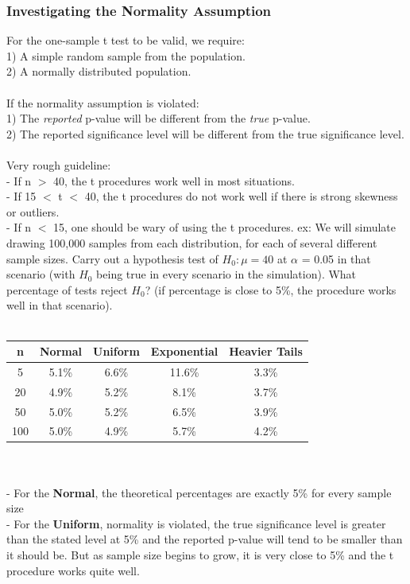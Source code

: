\documentclass[12pt, a4paper]{article}
\begin{document}
		\subsubsection{Investigating the Normality Assumption}
		For the one-sample t test to be valid, we require: \\
		1) A simple random sample from the population. \\
		2) A normally distributed population. \\~\\
		If the normality assumption is violated: \\
		1) The \textit{reported} p-value will be different from the \textit{true} p-value. \\
		2) The reported significance level will be different from the true significance level. \\~\\
		Very rough guideline: \\
		- If n $>$ 40, the t procedures work well in most situations. \\
		- If 15 $<$ t $<$ 40, the t procedures do not work well if there is strong skewness or outliers. \\
		- If n $<$ 15, one should be wary of using the t procedures. \newpage
		\noindent ex: We will simulate drawing 100,000 samples from each distribution, for each of several different sample sizes. Carry out a hypothesis test of $H_0: \mu = 40$ at $\alpha$ = 0.05 in that scenario (with $H_0$ being true in every scenario in the simulation). What percentage of tests reject $H_0$? (if percentage is close to 5\%, the procedure works well in that scenario). \\~\\
		\begin{tabular}{ |c|c|c|c|c| }
			\hline
			n & Normal & Uniform & Exponential & Heavier Tails \\ \hline
			5 & 5.1\% & 6.6\% & 11.6\% & 3.3\% \\
			20 & 4.9\% & 5.2\% &  8.1\% & 3.7\% \\
			50 & 5.0\% & 5.2\% & 6.5\% & 3.9\% \\
			100 & 5.0\% & 4.9\% & 5.7\% & 4.2\% \\
			\hline
		\end{tabular} \\~\\
		- For the \textbf{Normal}, the theoretical percentages are exactly 5\% for every sample size \\
		- For the \textbf{Uniform}, normality is violated, the true significance level is greater than the stated \hspace*{2mm} level at 5\% and the reported p-value will tend to be smaller than it should be. But as sample \hspace*{2mm} size begins to grow, it is very close to 5\% and the t procedure works quite well. \\
\end{document}

